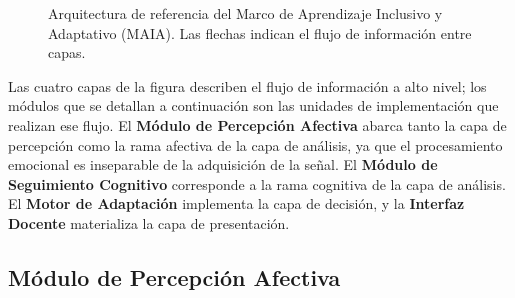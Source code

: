 \begin{figure}[htbp]
\centering
{}
\caption{Arquitectura de referencia del Marco de Aprendizaje Inclusivo y
Adaptativo (MAIA). Las flechas indican el flujo de información entre capas.}
\label{fig:arquitectura}
\end{figure}

Las cuatro capas de la figura describen el flujo de información a alto nivel;
los módulos que se detallan a continuación son las unidades de implementación
que realizan ese flujo. El \textbf{Módulo de Percepción Afectiva} abarca tanto la capa de percepción
como la rama afectiva de la capa de análisis, ya que
el procesamiento emocional es inseparable de la adquisición de la señal. El
\textbf{Módulo de Seguimiento Cognitivo} corresponde a la rama cognitiva de
la capa de análisis. El \textbf{Motor de Adaptación} implementa la capa de
decisión, y la \textbf{Interfaz Docente} materializa la capa de presentación.

\subsection{Módulo de Percepción Afectiva}

